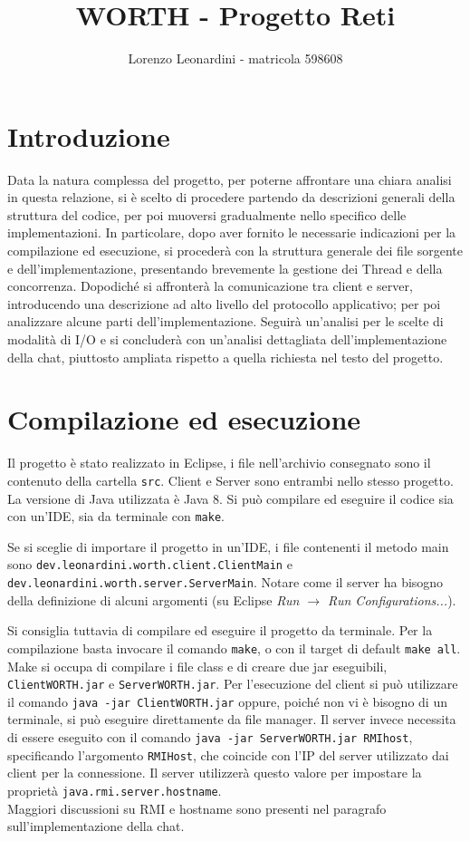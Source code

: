 \documentclass[a4paper,11pt] {article}
\title{\textbf{WORTH - Progetto Reti}}
\author{Lorenzo Leonardini - matricola 598608}
\date{}
\begin{document}
\maketitle

\section*{Introduzione}

Data la natura complessa del progetto, per poterne affrontare una chiara analisi in questa relazione, si è scelto di procedere partendo da descrizioni generali della struttura del codice, per poi muoversi gradualmente nello specifico delle implementazioni. In particolare, dopo aver fornito le necessarie indicazioni per la compilazione ed esecuzione, si procederà con la struttura generale dei file sorgente e dell'implementazione, presentando brevemente la gestione dei Thread e della concorrenza. Dopodiché si affronterà la comunicazione tra client e server, introducendo una descrizione ad alto livello del protocollo applicativo; per poi analizzare alcune parti dell'implementazione. Seguirà un'analisi per le scelte di modalità di I/O e si concluderà con un'analisi dettagliata dell'implementazione della chat, piuttosto ampliata rispetto a quella richiesta nel testo del progetto.

\section*{Compilazione ed esecuzione}

Il progetto è stato realizzato in Eclipse, i file nell'archivio consegnato sono il contenuto della cartella \texttt{src}. Client e Server sono entrambi nello stesso progetto. La versione di Java utilizzata è Java 8. Si può compilare ed eseguire il codice sia con un'IDE, sia da terminale con \texttt{make}.

Se si sceglie di importare il progetto in un'IDE, i file contenenti il metodo main sono \texttt{dev.leonardini.worth.client.ClientMain} e \texttt{dev.leonardini.worth.server.ServerMain}. Notare come il server ha bisogno della definizione di alcuni argomenti (su Eclipse \textit{Run $\to$ Run Configurations...}).

Si consiglia tuttavia di compilare ed eseguire il progetto da terminale. Per la compilazione basta invocare il comando \texttt{make}, o con il target di default \texttt{make all}. Make si occupa di compilare i file class e di creare due jar eseguibili, \texttt{ClientWORTH.jar} e \texttt{ServerWORTH.jar}. Per l'esecuzione del client si può utilizzare il comando \texttt{java -jar ClientWORTH.jar} oppure, poiché non vi è bisogno di un terminale, si può eseguire direttamente da file manager. Il server invece necessita di essere eseguito con il comando \texttt{java -jar ServerWORTH.jar RMIhost}, specificando l'argomento \texttt{RMIHost}, che coincide con l'IP del server utilizzato dai client per la connessione. Il server utilizzerà questo valore per impostare la proprietà \texttt{java.rmi.server.hostname}.\\
Maggiori discussioni su RMI e hostname sono presenti nel paragrafo sull'implementazione della chat.
\end{document}
